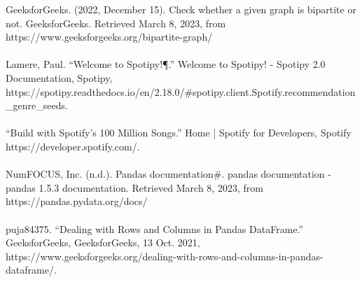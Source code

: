 \documentclass[fontsize=11pt]{article}
\begin{document}
GeeksforGeeks. (2022, December 15). Check whether a given graph is bipartite or not. GeeksforGeeks. Retrieved March 8, 2023, from https://www.geeksforgeeks.org/bipartite-graph/
\\\\
Lamere, Paul. “Welcome to Spotipy!¶.” Welcome to Spotipy! - Spotipy 2.0 Documentation, Spotipy, 
\\
https://spotipy.readthedocs.io/en/2.18.0/\#spotipy.client.Spotify.recommendation\_genre\_seeds. 
\\\\
“Build with Spotify's 100 Million Songs.” Home | Spotify for Developers, Spotify https://developer.spotify.com/. 
\\\\
NumFOCUS, Inc. (n.d.). Pandas documentation\#. pandas documentation - pandas 1.5.3 documentation. Retrieved March 8, 2023, from https://pandas.pydata.org/docs/
\\\\
puja84375. “Dealing with Rows and Columns in Pandas DataFrame.” GeeksforGeeks, GeeksforGeeks, 13 Oct. 2021, https://www.geeksforgeeks.org/dealing-with-rows-and-columns-in-pandas-dataframe/.



\end{document}
